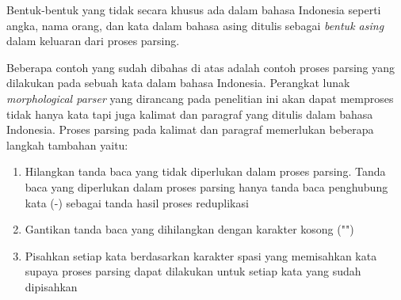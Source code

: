 Bentuk-bentuk yang tidak secara khusus ada dalam bahasa Indonesia seperti angka, nama orang, dan kata dalam bahasa asing ditulis sebagai \textit{bentuk asing} dalam keluaran dari proses parsing.

Beberapa contoh yang sudah dibahas di atas adalah contoh proses parsing yang dilakukan pada sebuah kata dalam bahasa Indonesia. Perangkat lunak \textit{morphological parser} yang dirancang pada penelitian ini akan dapat memproses tidak hanya kata tapi juga kalimat dan paragraf yang ditulis dalam bahasa Indonesia. Proses parsing pada kalimat dan paragraf memerlukan beberapa langkah tambahan yaitu:

\begin{enumerate}
	\item Hilangkan tanda baca yang tidak diperlukan dalam proses parsing. Tanda baca yang diperlukan dalam proses parsing hanya tanda baca penghubung kata (-) sebagai tanda hasil proses reduplikasi
	\item Gantikan tanda baca yang dihilangkan dengan karakter kosong ("")
	\item Pisahkan setiap kata berdasarkan karakter spasi yang memisahkan kata supaya proses parsing dapat dilakukan untuk setiap kata yang sudah dipisahkan
\end{enumerate}


